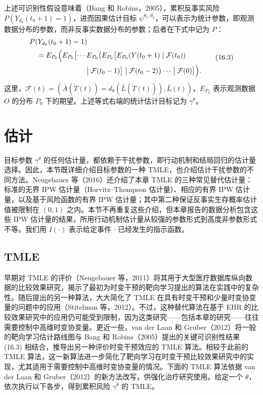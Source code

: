 上述可识别性假设意味着（Bang 和 Robins，2005），累积反事实风险 $P(Y_{d_\theta}(t_0+1)=1)$，进而因果估计目标 $\psi^{\theta_1,\theta_2}$，可以表示为统计参数，即观测数据分布的参数，而非反事实数据分布的参数；后者在下式中记为 $P$：
\begin{equation}
\begin{aligned}
 &P(Y_{d_\theta}(t_0+1)=1)\\
 &\quad=E_{P_0}\Bigl(E_{P_0}\bigl[\cdots E_{P_0}\bigl(
 E_{P_0}\bigl[E_{P_0}(Y(t_0+1)\mid\mathcal F(t_0))\\
 &\hspace{7.8em}\bigm|\mathcal F(t_0-1)\bigr]
 \bigm|\mathcal F(t_0-2)\bigr)\cdots\bigm|\mathcal F(0)\bigr]\Bigr).
\end{aligned}
\tag{16.3}
\end{equation}
这里，$\mathcal F(t)=(\bar A(\check T(t))=d_\theta(\bar L(\check T(t))),\bar L(t))$，$E_{P_0}$ 表示观测数据 $O$ 的分布 $P_0$ 下的期望。上述等式右端的统计估计目标记为 $\gamma^\theta$。

\section{估计}

目标参数 $\gamma^\theta$ 的任何估计量，都依赖于干扰参数，即行动机制和结局回归的估计量选择。因此，本节既详细介绍目标参数的一种 TMLE，也介绍估计干扰参数的不同方法。Neugebauer 等（2016）还介绍了本章 TMLE 的三种常见替代估计量：标准的无界 IPW 估计量（Horvitz--Thompson 估计量）、相应的有界 IPW 估计量，以及基于风险函数的有界 IPW 估计量；其中第二种保证反事实生存概率估计值被限制在 $(0,1)$ 之内。本节不再重复这些介绍，但本章报告的数据分析包含这些 IPW 估计量的结果，所用行动机制估计量从较强的参数形式到高度非参数形式不等。我们用 $I(\cdot)$ 表示给定事件 $\cdot$ 已经发生的指示函数。

\subsection{TMLE}

早期对 TMLE 的评价（Neugebauer 等，2011）将其用于大型医疗数据库纵向数据的比较效果研究，揭示了最初为时变干预的靶向学习提出的算法在实践中的复杂性。随后提出的另一种算法，大大简化了 TMLE 在具有时变干预和少量时变协变量的问题中的应用（Stitelman 等，2012）。不过，这种替代算法在基于 EHR 的比较效果研究中的应用仍可能受到限制，因为这类研究——包括本章的研究——往往需要控制中高维时变协变量。更近一些，van der Laan 和 Gruber（2012）将一般的靶向学习估计路线图与 Bang 和 Robins（2005）提出的关键可识别性结果 (16.3) 相结合，推导出另一种评价时变干预效应的 TMLE 算法。相较于此前的 TMLE 算法，这一新算法进一步简化了靶向学习在时变干预比较效果研究中的实现，尤其适用于需要控制中高维时变协变量的情况。下面的 TMLE 算法依据 van der Laan 和 Gruber（2012）的新方法改写，供强化治疗研究使用。给定一个 $\theta$，依次执行以下各步，得到累积风险 $\gamma^\theta$ 的 TMLE。

